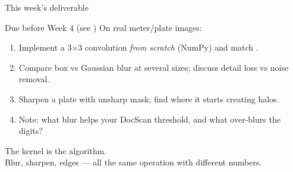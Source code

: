 \documentclass[10pt,aspectratio=169]{beamer}
\begin{document}
\begin{frame}{This week's deliverable}
  \begin{alertblock}{Due before Week 4 (see )}
    On real meter/plate images:
    \begin{enumerate}
      \item Implement a 3$\times$3 convolution \emph{from scratch} (NumPy) and match .
      \item Compare box vs Gaussian blur at several sizes; discuss detail loss vs noise removal.
      \item Sharpen a plate with unsharp mask; find where it starts creating halos.
      \item Note: what blur helps your DocScan threshold, and what over-blurs the digits?
    \end{enumerate}
  \end{alertblock}
\end{frame}

\begin{frame}[standout]
  The kernel is the algorithm.\\[4pt]
  \normalsize Blur, sharpen, edges — all the same operation with different numbers.
\end{frame}
\end{document}
